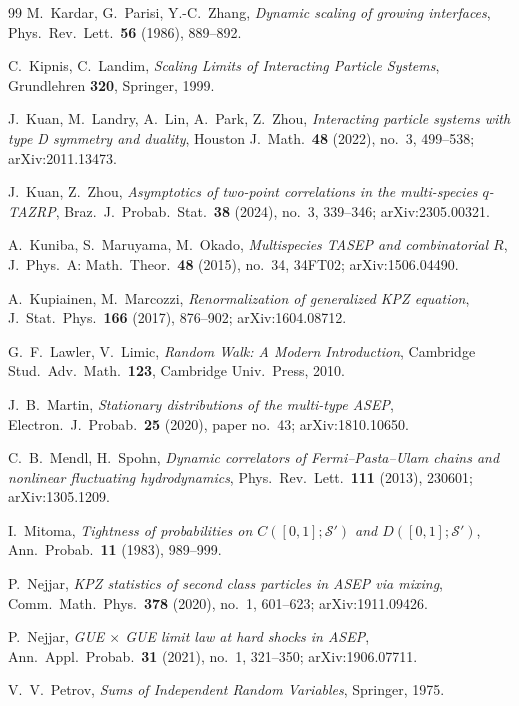 \begin{thebibliography}{99}
 M.~Kardar, G.~Parisi, Y.-C.~Zhang, \emph{Dynamic scaling of growing
interfaces}, Phys.~Rev.~Lett.~\textbf{56} (1986), 889--892.

 C.~Kipnis, C.~Landim, \emph{Scaling Limits of Interacting Particle Systems},
Grundlehren \textbf{320}, Springer, 1999.

 J.~Kuan, M.~Landry, A.~Lin, A.~Park, Z.~Zhou, \emph{Interacting particle
systems with type D symmetry and duality}, Houston J.~Math.~\textbf{48} (2022), no.~3,
499--538; arXiv:2011.13473.

 J.~Kuan, Z.~Zhou, \emph{Asymptotics of two-point correlations in
the multi-species $q$-TAZRP}, Braz.~J.~Probab.~Stat.~\textbf{38} (2024), no.~3,
339--346; arXiv:2305.00321.

 A.~Kuniba, S.~Maruyama, M.~Okado, \emph{Multispecies TASEP and
combinatorial $R$}, J.~Phys.~A: Math.~Theor.~\textbf{48} (2015), no.~34, 34FT02;
arXiv:1506.04490.

 A.~Kupiainen, M.~Marcozzi, \emph{Renormalization of
generalized KPZ equation}, J.~Stat.~Phys.~\textbf{166} (2017), 876--902;
arXiv:1604.08712.

 G.~F.~Lawler, V.~Limic, \emph{Random Walk: A Modern Introduction},
Cambridge Stud.~Adv.~Math.~\textbf{123}, Cambridge Univ.~Press, 2010.

 J.~B.~Martin, \emph{Stationary distributions of the multi-type
ASEP}, Electron.~J.~Probab.~\textbf{25} (2020), paper no.~43; arXiv:1810.10650.

 C.~B.~Mendl, H.~Spohn, \emph{Dynamic correlators of
Fermi--Pasta--Ulam chains and nonlinear fluctuating hydrodynamics},
Phys.~Rev.~Lett.~\textbf{111} (2013), 230601; arXiv:1305.1209.

 I.~Mitoma, \emph{Tightness of probabilities on
$C([0,1];\mathcal S')$ and $D([0,1];\mathcal S')$}, Ann.~Probab.~\textbf{11} (1983),
989--999.

 P.~Nejjar, \emph{KPZ statistics of second class particles in
ASEP via mixing}, Comm.~Math.~Phys.~\textbf{378} (2020), no.~1, 601--623;
arXiv:1911.09426.

 P.~Nejjar, \emph{GUE $\times$ GUE limit law at hard shocks in
ASEP}, Ann.~Appl.~Probab.~\textbf{31} (2021), no.~1, 321--350; arXiv:1906.07711.

 V.~V.~Petrov, \emph{Sums of Independent Random Variables}, Springer, 1975.


\end{thebibliography}
